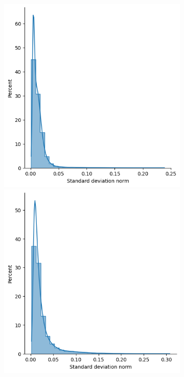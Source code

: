 \begin{figure}[htb]
\begin{subfigure}[t]{\textwidth+20pt\relax}
            \includegraphics[width=\dimexpr\linewidth-20pt\relax]{figures/ensemble/matched_all_std_norms.png}
            \includegraphics[width=\dimexpr\linewidth-20pt\relax]{figures/imle/matched_all_std_norms.png}

\end{subfigure}
\end{figure}
